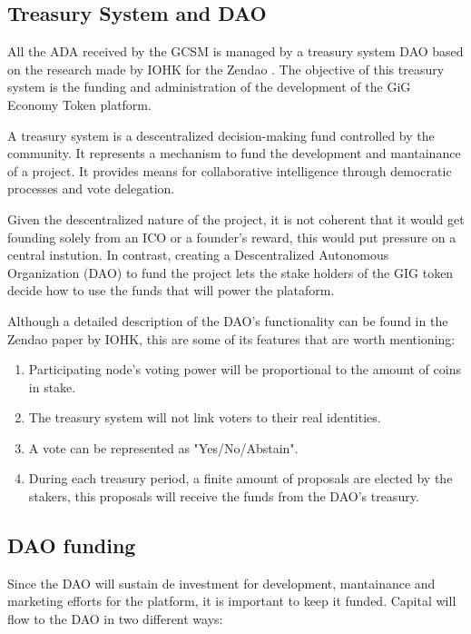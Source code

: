 \documentclass{article}
\begin{document}
\subsection{Treasury System and DAO}

All the ADA received by the GCSM is managed by a treasury system DAO based on the research made by IOHK for the Zendao \cite{zhangb2}. The objective of this treasury system is the funding and administration of the development of the GiG Economy Token platform.

A treasury system is a descentralized decision-making fund controlled by the community. It represents a mechanism to fund the development and mantainance of a project. It provides means for collaborative intelligence through democratic processes and vote delegation. 

Given the descentralized nature of the project, it is not coherent that it would get founding solely from an ICO or a founder's reward, this would put pressure on a central instution. In contrast, creating a Descentralized Autonomous Organization (DAO) to fund the project lets the stake holders of the GIG token decide how to use the funds that will power the plataform. 

Although a detailed description of the DAO's functionality can be found in the Zendao paper by IOHK, this are some of its features that are worth mentioning:

\begin{enumerate}

  \item Participating node's voting power will be proportional to the amount of coins in stake. 
  \item The treasury system will not link voters to their real identities.
  \item A vote can be represented as "Yes/No/Abstain".
  \item During each treasury period, a finite amount of proposals are elected by the stakers, this proposals will receive the funds from the DAO's treasury.
   
\end{enumerate}


\subsection{DAO funding}

Since the DAO will sustain de investment for development, mantainance and marketing efforts for the platform, it is important to keep it funded. Capital will flow to the DAO in two different ways:
\end{document}

